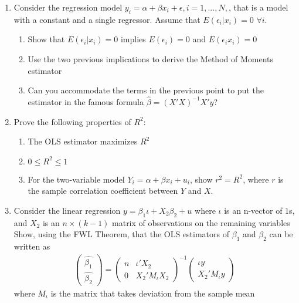 \documentclass[12pt,onecolumn]{article}
\begin{document}
\begin{enumerate}
  \item Consider the regression model $y_i = \alpha +\beta x_i +\epsilon, i=1,...,N,$, that is a model with a constant and a single regressor. Assume that $E(\epsilon_i|x_i)=0$ $\forall i$.
      \begin{enumerate}
        \item Show that $E(\epsilon_i|x_i)=0$ implies  $E(\epsilon_i)=0$ and  $E(\epsilon_i x_i)=0$
        \item Use the two previous implications to derive the Method of Moments estimator
        \item Can you accommodate the terms in the previous point to put the estimator in the famous formula $\hat \beta= (X'X)^{-1}X'y$?
      \end{enumerate}
  \item Prove the following properties of $R^2$:
        \begin{enumerate}
              \item The OLS estimator maximizes $R^2$
              \item $0 \leq R^2 \leq 1$
              \item For the two-variable model $Y_i = \alpha + \beta x_i + u_i$, show $r^2 = R^2$, where $r$ is the sample correlation coefficient between $Y$ and $X$.
    \end{enumerate}
    
    
  \item Consider the linear regression $y = \beta_1 \iota + X_2 \beta_2 +u$ where $\iota$ is an n-vector of 1s, and $X_2$ is an $n \times (k-1)$ matrix of observations on the remaining variables Show, using the FWL Theorem, that the OLS estimators of $\beta_1$ and $\beta_2$ can be written as
  \begin{align}
  \left(\begin{array}{c}
    \hat{\beta_{1}}\\
    \hat{\beta_{2}}
    \end{array}\right)=\left(\begin{array}{cc}
    n & \iota'X_{2}\\
    0 & X_{2}'M_{\iota}X_{2}
    \end{array}\right)^{-1}\left(\begin{array}{c}
    \iota y\\
    X_{2}'M_{\iota}y
    \end{array}\right)
  \end{align}
  where $M_{\iota}$ is the matrix that takes deviation from the sample mean


\end{enumerate}
\end{document}
